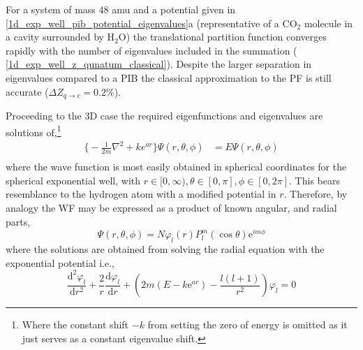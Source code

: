 \documentclass[../main.tex]{subfiles}
\begin{document}
For a system of mass 48 amu and a potential given in \figurename{ \ref{1d_exp_well_pib_potential_eigenvalues}a} (representative of a CO$_2$ molecule in a cavity surrounded by H$_2$O) the translational partition function converges rapidly with the number of eigenvalues included in the summation (\figurename{ \ref{1d_exp_well_z_qunatum_classical}}). Despite the larger separation in eigenvalues compared to a PIB the classical approximation to the PF is still accurate ($\Delta Z_{q\rightarrow c} = 0.2\%$).

Proceeding to the 3D case the required eigenfunctions and eigenvalues are solutions of,\footnote{Where the constant shift $-k$ from setting the zero of energy is omitted as it just serves as a constant eigenvalue shift.}
\begin{equation}
\begin{aligned}
{\Big \{} -\frac{1}{2m} \nabla^2 + k e^{ar} {\Big \}}\Psi(r, \theta, \phi) &= E\Psi(r, \theta, \phi) \\ 
\end{aligned}
\label{3d_exp_well_SE}
\end{equation}
where the wave function is most easily obtained in spherical coordinates for the spherical exponential well, with $r \in [0, \infty), \theta \in [0, \pi], \phi \in [0, 2\pi]$. This bears resemblance to the hydrogen atom with a modified potential in $r$. Therefore, by analogy the WF may be expressed as a product of known angular, and radial parts,
\begin{equation}
\Psi(r, \theta, \phi) = N \varphi_{l}(r) P_l^m(\cos\theta) \text{e}^{im\phi} 
\end{equation}
where the solutions are obtained from solving the radial equation with the exponential potential i.e.,
\begin{equation}
\frac{\text{d}^2\varphi_l}{\text{d} r^2} + \frac{2}{r} \frac{\text{d}\varphi_l}{\text{d}r} + \left(2m\left(E - k\text{e}^{ar}\right) - \frac{l(l+1)}{r^2}\right)\varphi_l = 0
\label{3d_exp_well_radial}
\end{equation}
\end{document}
